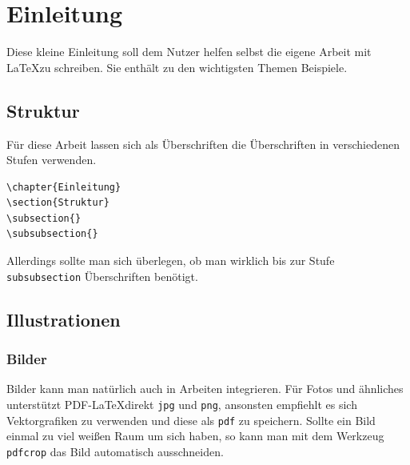 \chapter{Einleitung}

Diese kleine Einleitung soll dem Nutzer helfen selbst die eigene Arbeit mit \LaTeX zu schreiben. Sie enthält zu den wichtigsten Themen Beispiele.


\section{Struktur}

Für diese Arbeit lassen sich als Überschriften die Überschriften in verschiedenen Stufen verwenden.

\begin{verbatim}
\chapter{Einleitung}
\section{Struktur}
\subsection{}
\subsubsection{}
\end{verbatim}

Allerdings sollte man sich überlegen, ob man wirklich bis zur Stufe \verb|subsubsection| Überschriften benötigt.



\section{Illustrationen}


\subsection{Bilder}

Bilder kann man natürlich auch in Arbeiten integrieren. Für Fotos und ähnliches unterstützt PDF-\LaTeX direkt \verb|jpg| und \verb|png|, ansonsten empfiehlt es sich Vektorgrafiken zu verwenden und diese als \verb|pdf| zu speichern. Sollte ein Bild einmal zu viel weißen Raum um sich haben, so kann man mit dem Werkzeug \verb|pdfcrop| das Bild automatisch ausschneiden\cite{pdfcrop}.

